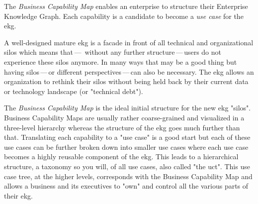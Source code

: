 %
%
The \textit{Business Capability Map} enables an enterprise to structure their Enterprise Knowledge Graph.
Each capability is a candidate to become a \textit{use case} for the \gls{ekg}.

A well-designed mature \gls{ekg} is a facade in front of all technical and organizational silos which means that\,---\,
without any further structure\,---\,users do not experience these silos anymore.
In many ways that may be a good thing but having silos\,---\,or different perspectives\,---\,can also be necessary.
The \gls{ekg} allows an organization to rethink their silos without being held back by their current data or technology
landscape (or "technical debt").

The \textit{Business Capability Map} is the ideal initial structure for the new \gls{ekg} "silos".
Business Capability Maps are usually rather coarse-grained and visualized in a three-level hierarchy whereas the
structure of the \gls{ekg} goes much further than that.
Translating each capability to a "use case" is a good start but each of these use cases can be further broken down
into smaller use cases where each use case becomes a highly reusable component of the \gls{ekg}.
This leads to a hierarchical structure, a taxonomy so you will, of all use cases, also called "the \gls{uct}".
This use case tree, at the higher levels, corresponds with the Business Capability Map and allows a business and
its executives to "own" and control all the various parts of their \gls{ekg}.

